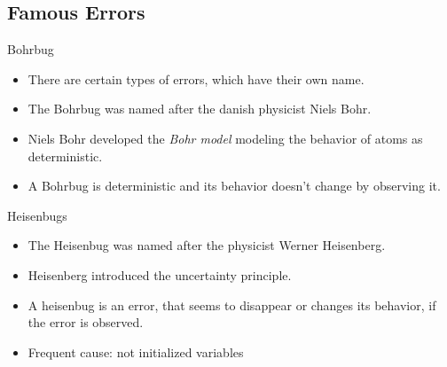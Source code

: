\subsection{Famous Errors}

\begin{frame}{Bohrbug}
\begin{itemize}
	\item There are certain types of errors, which have their own name.
	\item The Bohrbug was named after the danish physicist Niels Bohr.
	\item Niels Bohr developed the \emph{Bohr model} modeling the behavior of atoms as deterministic.
	\item A Bohrbug is deterministic and its behavior doesn't change by observing it.
\end{itemize}
\end{frame}

\begin{frame}{Heisenbugs}
\begin{itemize}
	\item The Heisenbug was named after the physicist Werner Heisenberg.
	\item Heisenberg introduced the uncertainty principle.
	\item A heisenbug is an error, that seems to disappear or changes its behavior, if the error is observed.
	\item Frequent cause: not initialized variables
\end{itemize}
\end{frame}

